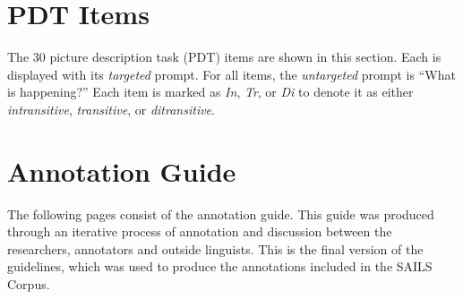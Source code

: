 \begin{appendices}



\chapter{PDT Items}
\label{appendix:PDT_items}
The 30 picture description task (PDT) items are shown in this section. Each is displayed with its \textit{targeted} prompt. For all items, the \textit{untargeted} prompt is ``What is happening?'' Each item is marked as \textit{In}, \textit{Tr}, or \textit{Di} to denote it as either \textit{intransitive}, \textit{transitive}, or \textit{ditransitive}.



\chapter{Annotation Guide}
\label{appendix:annotation_guide}
The following pages consist of the annotation guide. This guide was produced through an iterative process of annotation and discussion between the researchers, annotators and outside linguists. This is the final version of the guidelines, which was used to produce the annotations included in the SAILS Corpus.



\end{appendices}